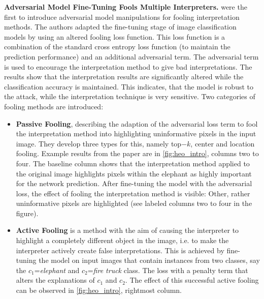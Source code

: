 \documentclass[sigconf]{acmart}
\newcommand{\mypar}[1]{\vspace{0.2cm}\noindent\textbf{#1}}
\begin{document}
\mypar{Adversarial Model Fine-Tuning Fools Multiple Interpreters.}\newline
\cite{fooling_nn_interpreters} were the first to introduce adversarial model manipulations for fooling interpretation methods. The authors adapted the fine-tuning stage of image classification models by using an altered fooling loss function. This loss function is a combination of the standard cross entropy loss function (to maintain the prediction performance) and an additional adversarial term. The adversarial term is used to encourage the interpretation method to give bad interpretations. The results show that the interpretation results are significantly altered while the classification accuracy is maintained. 
This indicates, that the model is robust to the attack, while the interpretation technique is very sensitive. 
Two categories of fooling methods are introduced: 
\begin{itemize}
    \item \textbf{Passive Fooling}, describing the adaption of the adversarial loss term to fool the interpretation method into highlighting uninformative pixels in the input image. They develop three types for this, namely top$-k$, center and location fooling. Example results from the paper are in \autoref{fig:heo_intro}, columns two to four. The baseline column shows that the interpretation method applied to the original image highlights pixels within the elephant as highly important for the network prediction. After fine-tuning the model with the adversarial loss, the effect of fooling the interpretation method is visible: Other, rather uninformative pixels are highlighted (see labeled columns two to four in the figure). 
    \item \textbf{Active Fooling} is a method with the aim of causing the interpreter to highlight a completely different object in the image, i.e. to make the interpreter actively create false interpretations. This is achieved by fine-tuning the model on input images that contain instances from two classes, say the $c_1$=\textit{elephant} and $c_2$=\textit{fire truck} class. The loss with a penalty term that alters the explanations of $c_1$ and $c_2$. The effect of this successful active fooling can be observed in \autoref{fig:heo_intro}, rightmost column.
\end{itemize}
\end{document}
